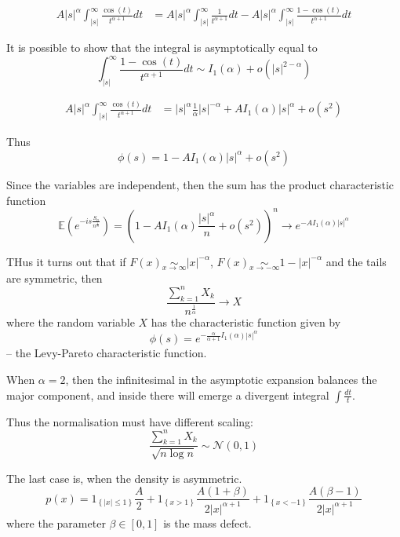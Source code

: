 \documentclass[a4paper]{article}
\newcommand{\obj}[1]{{\left\{ #1 \right \}}}
\newcommand{\clo}[1]{{\left [ #1 \right ]}}
\newcommand{\brac}[1]{{\left ( #1 \right )}}
\newcommand{\abs}[1]{{\left | #1 \right |}}
\newcommand{\Ex}{\mathbb{E}}
\begin{document}
\begin{align*}
A \abs{s}^\alpha \int_\abs{s}^\infty \frac{\cos(t)}{t^{\alpha+1}}dt &=  A \abs{s}^\alpha \int_\abs{s}^\infty \frac{1}{t^{\alpha+1}} dt - A \abs{s}^\alpha \int_\abs{s}^\infty \frac{1-\cos(t)}{t^{\alpha+1}}dt
\end{align*}


It is possible to show that the integral is asymptotically equal to
\[\int_\abs{s}^\infty \frac{1-\cos(t)}{t^{\alpha+1}}dt \sim I_1(\alpha) + o(\abs{s}^{2-\alpha})\]

\begin{align*}
A \abs{s}^\alpha \int_\abs{s}^\infty \frac{\cos(t)}{t^{\alpha+1}}dt &= \abs{s}^\alpha \frac{1}{\alpha} \abs{s}^{-\alpha} + AI_1(\alpha)\abs{s}^\alpha + o(s^2)
\end{align*}

Thus \[\phi(s) = 1 - A I_1(\alpha) \abs{s}^\alpha + o(s^2)\]

Since the variables are independent, then the sum has the product characteristic function
\[\Ex\brac{e^{-is\frac{S_n}{n^\frac{1}{\alpha}}}} = \brac{1 - A I_1(\alpha) \frac{\abs{s}^\alpha}{n} + o(s^2)}^n \to e^{-AI_1(\alpha)\abs{s}^\alpha}\]

THus it turns out that if $F(x)\underset{x\to\infty}{\sim} \abs{x}^{-\alpha}$,  $F(x)\underset{x\to-\infty}{\sim} 1-\abs{x}^{-\alpha}$ and the tails are symmetric, then \[\frac{\sum_{k=1}^{n}X_k}{n^\frac{1}{\alpha}}\to X\] where the random variable $X$ has the characteristic function given by \[\phi(s) = e^{-\frac{\alpha}{\alpha+1} I_1(\alpha)\abs{s}^\alpha}\] -- the Levy-Pareto characteristic function.

When $\alpha=2$, then the infinitesimal in the asymptotic expansion balances the major component, and inside there will emerge a divergent integral $\int \frac{dt}{t}$.

Thus the normalisation must have different scaling:
\[\frac{\sum_{k=1}^n X_k}{\sqrt{n\log n}}\sim \mathcal{N}(0,1)\]

The last case is, when the density is asymmetric.
\[p(x) = 1_\obj{\abs{x}\leq 1}\frac{A}{2} + 1_\obj{x>1}\frac{A(1+\beta)}{2\abs{x}^{\alpha+1}} + 1_\obj{x<-1}\frac{A(\beta-1)}{2\abs{x}^{\alpha+1}}\]
where the parameter $\beta\in\clo{0,1}$ is the mass defect.
\end{document}
